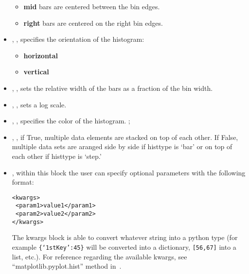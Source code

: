 \begin{itemize}
\begin{itemize}
    \item \textbf{mid} bars are centered between the bin edges.
    \item \textbf{right} bars are centered on the right bin edges.
  \end{itemize}
  \item {}, , specifies the 
  orientation of the histogram:
  \begin{itemize}
    \item \textbf{horizontal}
    \item \textbf{vertical}
  \end{itemize}
  \item {}, , sets the relative
  width of the bars as a fraction of the bin width.
  \item {}, , sets a log scale.
  \item {}, , specifies the color
  of the histogram.
  ;
  \item {}, , if True, multiple
  data elements are stacked on top of each other. If False, multiple data sets
  are aranged side by side if histtype is `bar' or on top of each other if
  histtype is `step.'
  \item {}, within this block the user can specify optional
  parameters with the following format:

\begin{lstlisting}[style=XML]
<kwargs>
 <param1>value1</param1>
 <param2>value2</param2>
</kwargs>
\end{lstlisting}

  The kwargs block is able to convert whatever string into a python type (for
  example  \texttt{\{`1stKey':45\}} will
  be converted into a dictionary, 
  \texttt{[56,67]}  into a list, etc.).
  For reference regarding the available kwargs, see ``matplotlib.pyplot.hist''
  method in~\cite{MatPlotLib}.
    \end{itemize}

